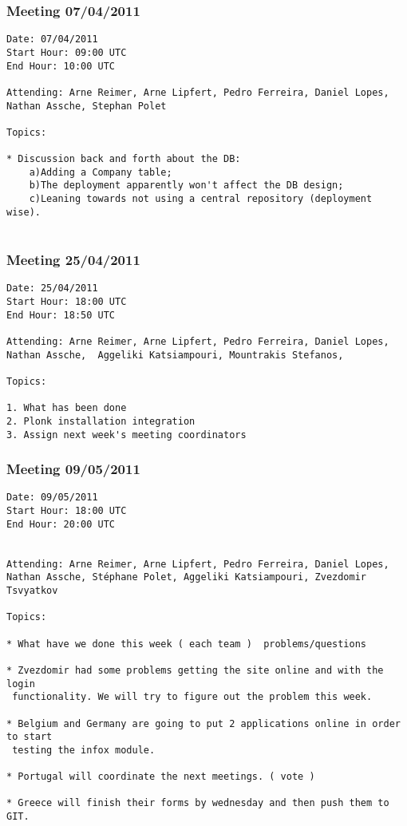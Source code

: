 \subsubsection{Meeting 07/04/2011}

\begin{verbatim}
Date: 07/04/2011 
Start Hour: 09:00 UTC
End Hour: 10:00 UTC

Attending: Arne Reimer, Arne Lipfert, Pedro Ferreira, Daniel Lopes,
Nathan Assche, Stephan Polet

Topics:

* Discussion back and forth about the DB:
	a)Adding a Company table;
	b)The deployment apparently won't affect the DB design;
	c)Leaning towards not using a central repository (deployment wise).
		
\end{verbatim}

\subsubsection{Meeting 25/04/2011}

\begin{verbatim}
Date: 25/04/2011
Start Hour: 18:00 UTC
End Hour: 18:50 UTC

Attending: Arne Reimer, Arne Lipfert, Pedro Ferreira, Daniel Lopes,
Nathan Assche,  Aggeliki Katsiampouri, Mountrakis Stefanos,

Topics:

1. What has been done
2. Plonk installation integration
3. Assign next week's meeting coordinators
\end{verbatim}

\subsubsection{Meeting 09/05/2011}

\begin{verbatim}
Date: 09/05/2011
Start Hour: 18:00 UTC
End Hour: 20:00 UTC


Attending: Arne Reimer, Arne Lipfert, Pedro Ferreira, Daniel Lopes,
Nathan Assche, Stéphane Polet, Aggeliki Katsiampouri, Zvezdomir Tsvyatkov

Topics:

* What have we done this week ( each team )  problems/questions
    
* Zvezdomir had some problems getting the site online and with the login
 functionality. We will try to figure out the problem this week.

* Belgium and Germany are going to put 2 applications online in order to start
 testing the infox module.

* Portugal will coordinate the next meetings. ( vote )

* Greece will finish their forms by wednesday and then push them to GIT.
\end{verbatim}

